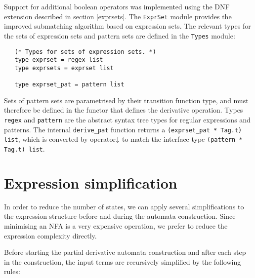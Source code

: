Support for additional boolean operators was implemented using the DNF extension
described in section \ref{exprsets}.  The \texttt{ExprSet} module provides the
improved submatching algorithm based on expression sets.  The relevant types
for the sets of expression sets and pattern sets are defined in the
\texttt{Types} module:

\begin{lstlisting}
   (* Types for sets of expression sets. *)
   type exprset = regex list
   type exprsets = exprset list

   type exprset_pat = pattern list
\end{lstlisting}

Sets of pattern sets are parametrised by their transition function type, and
must therefore be defined in the functor that defines the derivative operation.
Types \texttt{regex} and \texttt{pattern} are the abstract syntax tree types for
regular expressions and patterns. The internal \texttt{derive\_pat} function
returns a \texttt{(exprset\_pat * Tag.t) list}, which is converted by operator
$\!\!\downarrow$ to match the interface type \texttt{(pattern * Tag.t) list}.




\section{Expression simplification}

In order to reduce the number of states, we can apply several simplifications to
the expression structure before and during the automata construction. Since
minimising an NFA is a very expensive operation, we prefer to reduce the
expression complexity directly.

Before starting the partial derivative automata construction and after each step
in the construction, the input terms are recursively simplified by the following
rules:

